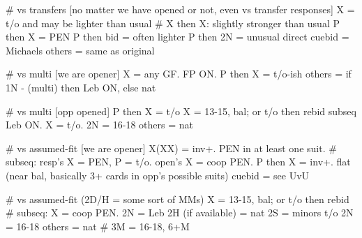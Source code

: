 # vs transfers [no matter we have opened or not, even vs transfer responses]
X = t/o and may be lighter than usual  # X then X: slightly stronger than usual
P then X = PEN
P then bid = often lighter
P then 2N = unusual
direct cuebid = Michaels
others = same as original

# vs multi [we are opener]
X = any GF. FP ON.
P then X = t/o-ish
others = if 1N - (multi) then Leb ON, else nat

# vs multi [opp opened]
P then X = t/o
X = 13-15, bal; or t/o then rebid
    subseq Leb ON. X = t/o.
2N = 16-18
others = nat

# vs assumed-fit [we are opener]
X(XX) = inv+. PEN in at least one suit.
    # subseq: resp's X = PEN, P = t/o. open's X = coop PEN.
P then X = inv+. flat (near bal, basically 3+ cards in opp's possible suits)
cuebid = see UvU

# vs assumed-fit (2D/H = some sort of MMs)
X = 13-15, bal; or t/o then rebid
    # subseq: X = coop PEN. 2N = Leb
2H (if available) = nat
2S = minors t/o
2N = 16-18
others = nat  # 3M = 16-18, 6+M

